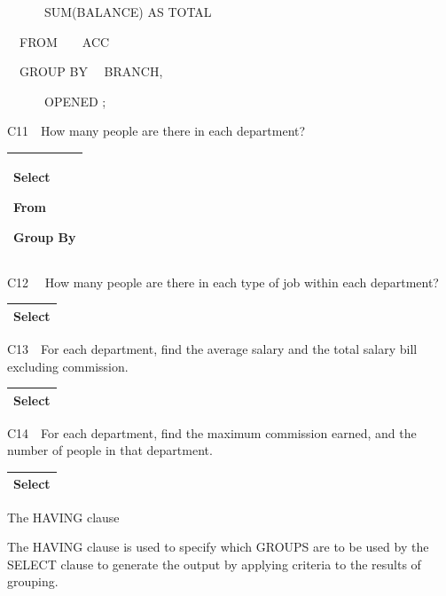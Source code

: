 \ \ \ \ \ \ SUM(BALANCE) AS TOTAL

\ \ FROM\ \  \ \ ACC 

\ \ GROUP BY \ \ BRANCH,

\ \ \ \ \ \ OPENED ;

C11\ \ How many people are there in each department?

\begin{flushleft}
\tablefirsthead{}
\tablehead{}
\tabletail{}
\tablelasttail{}
\begin{supertabular}{|m{14.583cm}|}
\hline
Select

From

Group By

\\\hline
\end{supertabular}
\end{flushleft}
C12 \ \ How many people are there in each type of job within each department?

\begin{flushleft}
\tablefirsthead{}
\tablehead{}
\tabletail{}
\tablelasttail{}
\begin{supertabular}{|m{14.583cm}|}
\hline
Select

\\\hline
\end{supertabular}
\end{flushleft}
C13\ \ For each department, find the average salary and the total salary bill excluding commission. 

\begin{flushleft}
\tablefirsthead{}
\tablehead{}
\tabletail{}
\tablelasttail{}
\begin{supertabular}{|m{14.583cm}|}
\hline
Select

\\\hline
\end{supertabular}
\end{flushleft}
C14\ \ For each department, find the maximum commission earned, and the number of people in that department.

\begin{flushleft}
\tablefirsthead{}
\tablehead{}
\tabletail{}
\tablelasttail{}
\begin{supertabular}{|m{14.583cm}|}
\hline
Select

\\\hline
\end{supertabular}
\end{flushleft}
The HAVING clause

The HAVING clause is used to specify which GROUPS are to be used by the SELECT clause to generate the output by applying criteria to the results of grouping.

